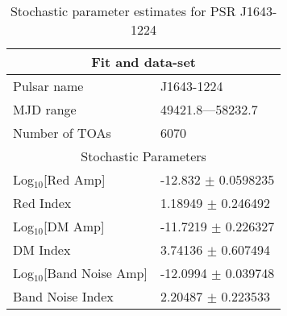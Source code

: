 \documentclass{article}
\begin{document}
\begin{table*}
\caption{Stochastic parameter estimates for PSR J1643-1224}
\begin{tabular}{ll}
\hline\hline
\multicolumn{2}{c}{Fit and data-set} \\ 
\hline
Pulsar name\dotfill & J1643-1224 \\ 
MJD range\dotfill & 49421.8---58232.7 \\ 
Number of TOAs\dotfill & 6070 \\
\hline
\multicolumn{2}{c}{Stochastic Parameters} \\ 
\hline
Log$_{10}$[Red Amp] \dotfill & -12.832 $\pm$ 0.0598235  \\ 
Red Index \dotfill & 1.18949 $\pm$ 0.246492  \\ 
Log$_{10}$[DM Amp] \dotfill & -11.7219 $\pm$ 0.226327  \\ 
DM Index \dotfill & 3.74136 $\pm$ 0.607494  \\ 
Log$_{10}$[Band Noise Amp] \dotfill & -12.0994 $\pm$ 0.039748  \\ 
Band Noise Index \dotfill & 2.20487 $\pm$ 0.223533  \\ 
\hline
\end{tabular}
\label{Table:J1643-1224}
\end{table*} 
\end{document}
